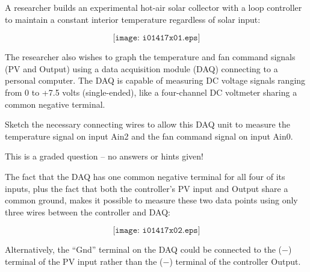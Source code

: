 

A researcher builds an experimental hot-air solar collector with a loop controller to maintain a constant interior temperature regardless of solar input:

$$\texttt{[image: i01417x01.eps]}$$

The researcher also wishes to graph the temperature and fan command signals (PV and Output) using a data acquisition module (DAQ) connecting to a personal computer.  The DAQ is capable of measuring DC voltage signals ranging from 0 to +7.5 volts (single-ended), like a four-channel DC voltmeter sharing a common negative terminal.

\vskip 10pt

Sketch the necessary connecting wires to allow this DAQ unit to measure the temperature signal on input Ain2 and the fan command signal on input Ain0.

\vfil 

\eject






This is a graded question -- no answers or hints given!
 






The fact that the DAQ has one common negative terminal for all four of its inputs, plus the fact that both the controller's PV input and Output share a common ground, makes it possible to measure these two data points using only three wires between the controller and DAQ:

$$\texttt{[image: i01417x02.eps]}$$

Alternatively, the ``Gnd'' terminal on the DAQ could be connected to the ($-$) terminal of the PV input rather than the ($-$) terminal of the controller Output.




